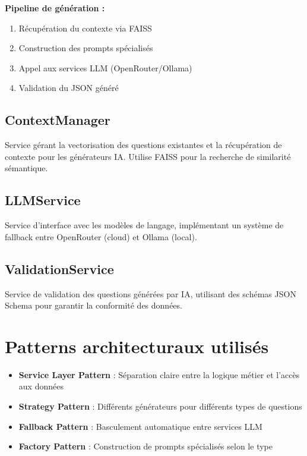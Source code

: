 \documentclass{report}
\begin{document}
\textbf{Pipeline de génération :}
\begin{enumerate}
    \item Récupération du contexte via FAISS
    \item Construction des prompts spécialisés
    \item Appel aux services LLM (OpenRouter/Ollama)
    \item Validation du JSON généré
\end{enumerate}

\subsection{ContextManager}
Service gérant la vectorisation des questions existantes et la récupération de contexte pour les générateurs IA. Utilise FAISS pour la recherche de similarité sémantique.

\subsection{LLMService}
Service d'interface avec les modèles de langage, implémentant un système de fallback entre OpenRouter (cloud) et Ollama (local).

\subsection{ValidationService}
Service de validation des questions générées par IA, utilisant des schémas JSON Schema pour garantir la conformité des données.

\section{Patterns architecturaux utilisés}

\begin{itemize}
    \item \textbf{Service Layer Pattern} : Séparation claire entre la logique métier et l'accès aux données
    \item \textbf{Strategy Pattern} : Différents générateurs pour différents types de questions
    \item \textbf{Fallback Pattern} : Basculement automatique entre services LLM
    \item \textbf{Factory Pattern} : Construction de prompts spécialisés selon le type
\end{itemize}
\end{document}
